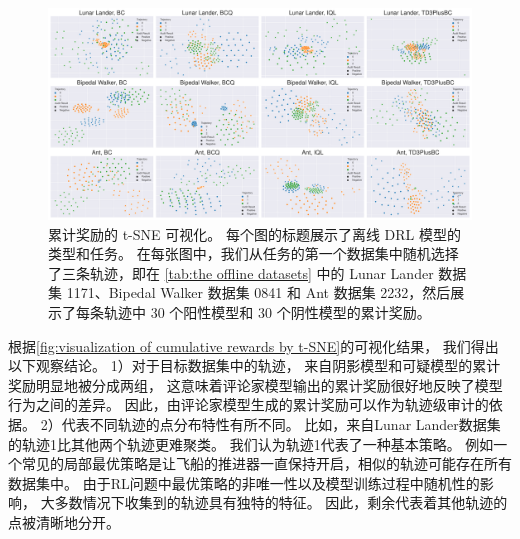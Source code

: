 \begin{figure}[!ht]
    \centering
    \includegraphics[width=\hsize]{figure/orl_auditor/tsne-num_episode_3-20230202182507986.pdf}
    \caption{
        累计奖励的 t-SNE 可视化。
        每个图的标题展示了离线 DRL 模型的类型和任务。
        在每张图中，我们从任务的第一个数据集中随机选择了三条轨迹，即在 \autoref{tab:the offline datasets} 中的 Lunar Lander 数据集 1171、Bipedal Walker 数据集 0841 和 Ant 数据集 2232，然后展示了每条轨迹中 30 个阳性模型和 30 个阴性模型的累计奖励。
        }
    \label{fig:visualization of cumulative rewards by t-SNE}
\end{figure}



根据\autoref{fig:visualization of cumulative rewards by t-SNE}的可视化结果，
我们得出以下观察结论。
1）对于目标数据集中的轨迹，
来自阴影模型和可疑模型的累计奖励明显地被分成两组，
这意味着评论家模型输出的累计奖励很好地反映了模型行为之间的差异。
因此，由评论家模型生成的累计奖励可以作为轨迹级审计的依据。
2）代表不同轨迹的点分布特性有所不同。
比如，来自Lunar Lander数据集的轨迹1比其他两个轨迹更难聚类。
我们认为轨迹1代表了一种基本策略。
例如一个常见的局部最优策略是让飞船的推进器一直保持开启，相似的轨迹可能存在所有数据集中。
由于RL问题中最优策略的非唯一性以及模型训练过程中随机性的影响，
大多数情况下收集到的轨迹具有独特的特征。
因此，剩余代表着其他轨迹的点被清晰地分开。

